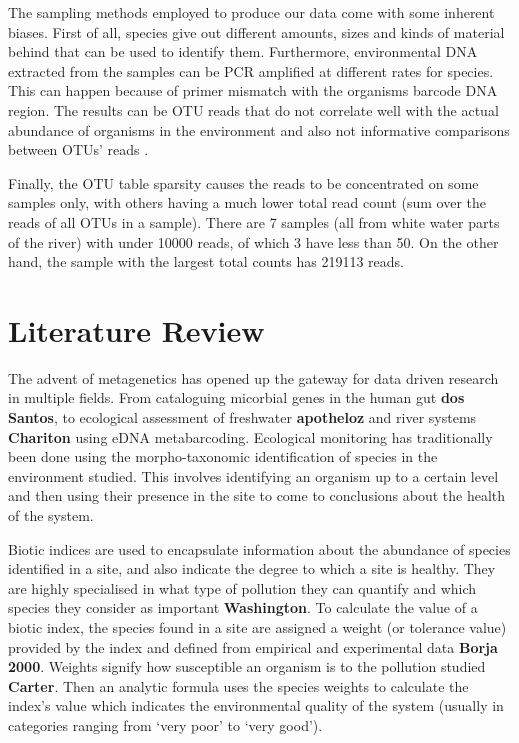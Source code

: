 The sampling methods employed to produce our data come with some inherent biases. First of all, species give out different amounts, sizes and kinds of material behind that can be used to identify them. Furthermore, environmental DNA extracted from the samples can be PCR amplified at different rates for species. This can happen because of primer mismatch with the organisms barcode DNA region. The results can be OTU reads that do not correlate well with the actual abundance of organisms in the environment and also not informative comparisons between OTUs' reads \cite{abundance_nodate}. 

Finally, the OTU table sparsity causes the reads to be concentrated on some samples only, with others having a much lower total read count (sum over the reads of all OTUs in a sample). There are 7 samples (all from white water parts of the river) with under 10000 reads, of which 3 have less than 50. On the other hand, the sample with the largest total counts has 219113 reads. 



\section{Literature Review}
The advent of metagenetics has opened up the gateway for data driven research in multiple fields. From cataloguing micorbial genes in the human gut {\bf dos Santos}, to ecological assessment of freshwater \textbf{apotheloz} and river systems \textbf{Chariton} using eDNA metabarcoding. Ecological monitoring has traditionally been done using the morpho-taxonomic identification of species in the environment studied. This involves identifying an organism up to a certain level and then using their presence in the site to come to conclusions about the health of the system.


Biotic indices are used to encapsulate information about the abundance of species identified in a site, and also indicate the degree to which a site is healthy. They are highly specialised in what type of pollution they can quantify and which species they consider as important \textbf{Washington}. To calculate the value of a biotic index, the species found in a site are assigned a weight (or tolerance value) provided by the index and defined from empirical and experimental data \textbf{Borja 2000}. Weights signify how susceptible an organism is to the pollution studied \textbf{Carter}. Then an analytic formula uses the species weights to calculate the index's value which indicates the environmental quality of the system (usually in categories ranging from `very poor' to `very good').

